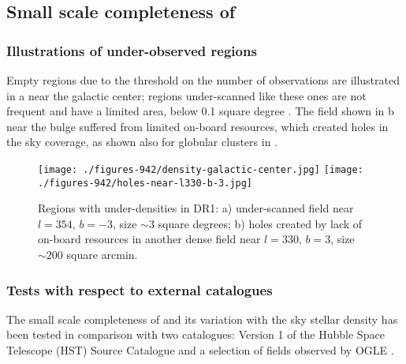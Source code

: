 \subsection{Small scale completeness of {}} 

\subsubsection{Illustrations of under-observed regions\label{sec:underdensity}}

Empty regions due to the threshold on the number of observations are 
illustrated in a near the galactic center; regions under-scanned 
like these ones are not frequent and have a
limited area, below 0.1 square degree \citep[see also][Sect. 6.2]{DPACP-8}. The field shown in b
near the bulge suffered from limited on-board resources, which created holes
in the sky coverage, as shown also for globular clusters in .

\begin{figure}
\centering
\texttt{[image: ./figures-942/density-galactic-center.jpg]}
\texttt{[image: ./figures-942/holes-near-l330-b-3.jpg]}
\caption{Regions with under-densities in DR1: a) under-scanned field near $l=354${\deg}, $b=-3${\deg}, 
size $\sim 3$ square degrees;
b) holes created by lack of on-board resources in another dense field near $l=330${\deg}, $b=3${\deg}, size $\sim 200$ square arcmin.}
\label{fig:942_holes}
\end{figure}

\subsubsection{Tests with respect to external catalogues\label{sec:wp944_smallscalecompleteness}}
The small scale completeness of {} and its variation with the sky stellar density has been tested in comparison with two catalogues:  Version 1 of the Hubble Space Telescope (HST) Source Catalogue \citep[HSC,][]{2016AJ....151..134W} and a selection of fields observed by OGLE \citep{2008AcA....58...69U}. 

